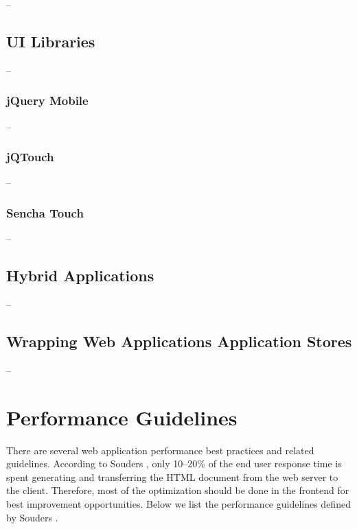 --

\subsection{UI Libraries}

--

\subsubsection{jQuery Mobile}

--

\subsubsection{jQTouch}

--

\subsubsection{Sencha Touch}

--

\subsection{Hybrid Applications}

--

\subsection{Wrapping Web Applications Application Stores}

--

\clearpage
\section{Performance Guidelines}
\label{section:performance-guidelines}

There are several web application performance best practices and
related guidelines. According to Souders \cite{souders2007high}, only
10--20\% of the end user response time is spent generating and
transferring the HTML document from the web server to the
client. Therefore, most of the optimization should be done in the
frontend for best improvement opportunities. Below we list the
performance guidelines defined by Souders \cite{souders2007high,
  souders2009even}.

